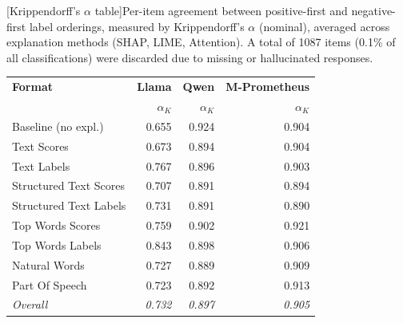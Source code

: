\FloatBarrier
\begin{center}
\small
{}[Krippendorff's $\alpha$ table]{Per-item agreement between positive-first and negative-first label orderings, measured by Krippendorff's $\alpha$ (nominal), averaged across explanation methods (SHAP, LIME, Attention). A total of 1087 items (0.1\% of all classifications) were discarded due to missing or hallucinated responses.}
\label{tab:agreement_raw}
\begin{tabular}{lrrr}
\toprule
\textbf{Format} & \textbf{Llama} & \textbf{Qwen} & \textbf{M-Prometheus} \\
 & $\alpha_{K}$ & $\alpha_{K}$ & $\alpha_{K}$ \\
\midrule
Baseline (no expl.) & 0.655 & 0.924 & 0.904 \\
\midrule
Text Scores & 0.673 & 0.894 & 0.904 \\
Text Labels & 0.767 & 0.896 & 0.903 \\
Structured Text Scores & 0.707 & 0.891 & 0.894 \\
Structured Text Labels & 0.731 & 0.891 & 0.890 \\
Top Words Scores & 0.759 & 0.902 & 0.921 \\
Top Words Labels & 0.843 & 0.898 & 0.906 \\
Natural Words & 0.727 & 0.889 & 0.909 \\
Part Of Speech & 0.723 & 0.892 & 0.913 \\
\midrule
\textit{Overall} & \textit{0.732} & \textit{0.897} & \textit{0.905} \\
\bottomrule
\end{tabular}
\end{center}